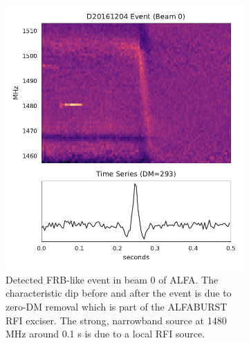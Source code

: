 \documentclass[a4paper,fleqn,usenatbib]{mnras}
\begin{document}
\begin{figure}
    \centering
    \begin{subfigure}[t]{0.45\textwidth}
        \centering\captionsetup{width=.95\linewidth}
        \includegraphics[width=1.0\textwidth]{figures/D20161204_buf23_Beam0.pdf}
        \caption{Detected FRB-like event in beam 0 of ALFA. The characteristic dip
        before and after the event is due to zero-DM removal which is part of the
        ALFABURST RFI exciser. The strong, narrowband source at 1480 MHz around 0.1
        s is due to a  local RFI source.  }
        \label{fig:beam0_dynamic_spec}
    \end{subfigure}
    \begin{subfigure}[t]{0.45\textwidth}
        \centering\captionsetup{width=.95\linewidth}

\end{subfigure}
\end{figure}
\end{document}
